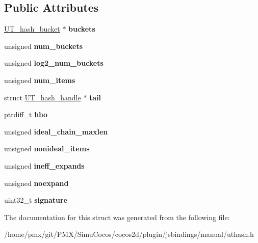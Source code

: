 \subsection*{Public Attributes}
\begin{DoxyCompactItemize}
\item 
\mbox{\label{structUT__hash__table_a04556bbef9c9a1c40b1bc0d17a2a6e0b}} 
\hyperlink{structUT__hash__bucket}{U\+T\+\_\+hash\+\_\+bucket} $\ast$ {\bfseries buckets}
\item 
\mbox{\label{structUT__hash__table_a3ed04b6233facaedf910672578d86339}} 
unsigned {\bfseries num\+\_\+buckets}
\item 
\mbox{\label{structUT__hash__table_ae376a7f3fac525f3a9d03b6beec8d12f}} 
unsigned {\bfseries log2\+\_\+num\+\_\+buckets}
\item 
\mbox{\label{structUT__hash__table_a74534cc14f080c96f94d8f5da83d9d76}} 
unsigned {\bfseries num\+\_\+items}
\item 
\mbox{\label{structUT__hash__table_a00a889a5e1ebaeec0a83ec2701df1992}} 
struct \hyperlink{structUT__hash__handle}{U\+T\+\_\+hash\+\_\+handle} $\ast$ {\bfseries tail}
\item 
\mbox{\label{structUT__hash__table_afd05f4d9e45354fb010367ae9e1bddb6}} 
ptrdiff\+\_\+t {\bfseries hho}
\item 
\mbox{\label{structUT__hash__table_a5f1cec93d5d753ba02097c797e4d67ad}} 
unsigned {\bfseries ideal\+\_\+chain\+\_\+maxlen}
\item 
\mbox{\label{structUT__hash__table_a8cb66cfb259a204cda59a815e4db664f}} 
unsigned {\bfseries nonideal\+\_\+items}
\item 
\mbox{\label{structUT__hash__table_a216c7d98cf40a0064bee94aa8a5bf1b7}} 
unsigned {\bfseries ineff\+\_\+expands}
\item 
\mbox{\label{structUT__hash__table_a635661789933752e7b83dac84430eae1}} 
unsigned {\bfseries noexpand}
\item 
\mbox{\label{structUT__hash__table_a87d1ab3f3ede1809c6a485972d20b25f}} 
uint32\+\_\+t {\bfseries signature}
\end{DoxyCompactItemize}


The documentation for this struct was generated from the following file\+:\begin{DoxyCompactItemize}
\item 
/home/pmx/git/\+P\+M\+X/\+Simu\+Cocos/cocos2d/plugin/jsbindings/manual/uthash.\+h\end{DoxyCompactItemize}
